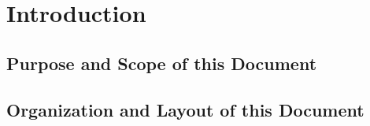 %
%

\section{Introduction}

\subsection{Purpose and Scope of this Document}

\subsection{Organization and Layout of this Document}







